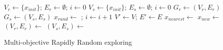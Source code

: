 \documentclass[conference]{IEEEtran}
\begin{document}
\begin{algorithm}
	\label{alg:rapidly_exploring_process}
	\begin{algorithmic}[1]
		\State $ V_{r} \leftarrow \{ x_{init} \} $; $ E_{r} \leftarrow \emptyset $; $ i \leftarrow 0 $
		\EndFor
		\State $ V_{s} \leftarrow \{ x_{init} \} $; $ E_{s} \leftarrow \emptyset $; $ i \leftarrow 0 $
		\EndFor
		\State $ G_{r} \leftarrow (V_{r}, E_{r}) $
		\EndFor
		\State $ G_{s} \leftarrow (V_{s}, E_{s}) $
		\EndFor
		\State $ x_{rand} \leftarrow $  ; $ i \leftarrow i + 1 $
		\State $ V' \leftarrow V $; $ E' \leftarrow E $
		\State $ x_{nearest} \leftarrow $ 
		\State $ x_{new} \leftarrow $ 
		\State $ (V_{r}, E_{r}) \leftarrow $ 
		\EndFor
		\State $ (V_{s}, E_{s}) \leftarrow $ 
		\EndFor
		\EndIf
		\EndWhile
	\end{algorithmic}
	\caption{Multi-objective Rapidly Random exploring }
\end{algorithm}
\end{document}

